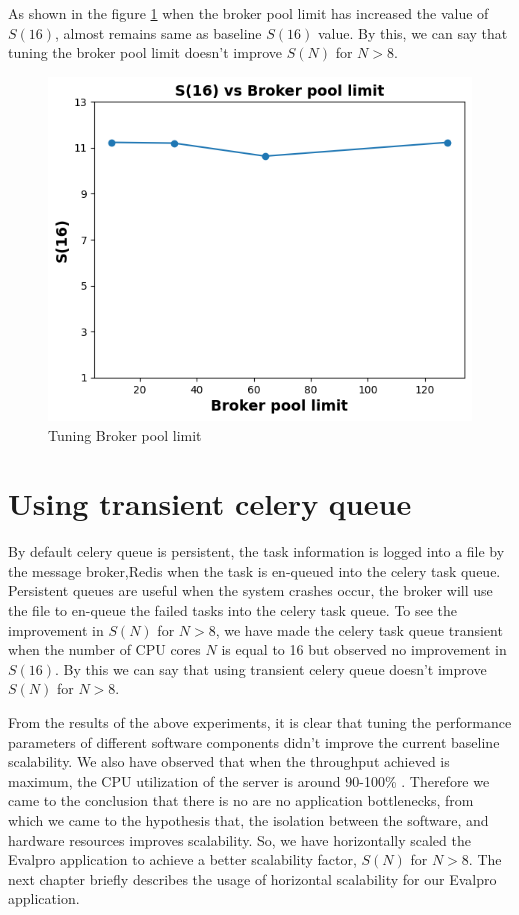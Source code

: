 \documentclass{iitbreport}
\begin{document}
As shown in the figure \ref{broker_pool_limit} when the broker pool limit has increased the value of $S(16)$, almost remains same as baseline $S(16)$ value. By this, we can say that tuning the broker pool limit doesn't improve $S(N)$ for $N>8$.
\begin{figure}[!htb]
  \centering
  \includegraphics[width=\linewidth]{Images/broker_limit.png}
  \caption{Tuning Broker pool limit}
  \label{broker_pool_limit}
\end{figure}
\section{Using transient celery queue}
By default celery queue is persistent, the task information is logged
into a file by the message broker,Redis when the task is en-queued into the celery task queue. Persistent queues are useful when the system crashes occur, the broker will  use the file to en-queue the failed tasks into the celery 
task queue. To see the improvement in $S(N)$ for $N>8$, we have made the celery task queue transient when the number of CPU cores $N$ is equal to 16 but observed no improvement in $S(16)$. By this we can say that using transient celery queue doesn't improve  $S(N)$ for $N>8$.


From the results of the above experiments, it is clear that tuning the performance parameters of different software components didn't improve the current baseline scalability. We also have observed that when the throughput achieved is maximum, the CPU utilization of the server is around 90-100\% . Therefore we came to the conclusion that there is no  are no application bottlenecks, from which we came to the hypothesis that, the isolation between the software, and hardware resources improves scalability. So, we have  horizontally scaled the Evalpro application to achieve a better scalability factor, $S(N)$ for $N>8$.  The next chapter briefly describes the usage of horizontal scalability for our Evalpro application.
\end{document}
